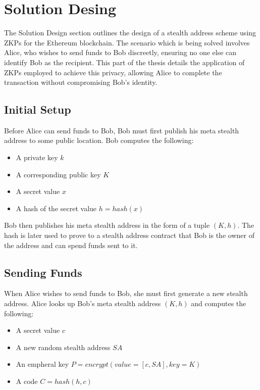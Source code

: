 \chapter{Solution Desing}

The Solution Design section outlines the design of a stealth address
scheme using ZKPs for the Ethereum blockchain. The scenario which is being
solved involves Alice, who wishes to send funds to Bob discreetly, ensuring no
one else can identify Bob as the recipient. This part of the thesis details
the application of ZKPs employed to achieve this privacy, allowing Alice to
complete the transaction without compromising Bob's identity.

\section{Initial Setup}

Before Alice can send funds to Bob, Bob must first publish his meta stealth
address to some public location. Bob computes the following:

\begin{itemize}
	\item A private key $k$
	\item A corresponding public key $K$
	\item A secret value $x$
	\item A hash of the secret value $h = hash(x)$
\end{itemize}

Bob then publishes his meta stealth address in the form of a tuple $(K, h)$.
The hash is later used to prove to a stealth address contract that Bob is the
owner of the address and can spend funds sent to it.

\section{Sending Funds}

When Alice wishes to send funds to Bob, she must first generate a new stealth
address. Alice looks up Bob's meta stealth address $(K, h)$ and computes the
following:

\begin{itemize}
	\item A secret value $c$
	\item A new random stealth address $SA$
	\item An empheral key $P = encrypt(value=[c, SA], key=K)$
	\item A code $C = hash(h, c)$
\end{itemize}

